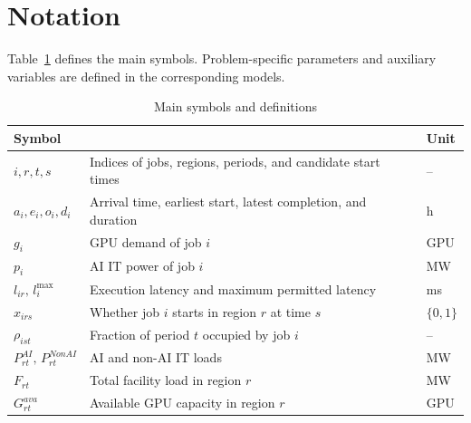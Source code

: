 \section{Notation}

Table~\ref{tab:symbols} defines the main symbols.
Problem-specific parameters and auxiliary variables are defined in the corresponding models.

\begin{table}[H]
	\centering
    \caption{Main symbols and definitions}
	\label{tab:symbols}
	
	\small
	\renewcommand{\arraystretch}{0.85}
	
	\begin{tabularx}{0.96\textwidth}{
			>{\centering\arraybackslash}p{}
			>{\raggedright\arraybackslash}X
			>{\centering\arraybackslash}p{}}
		\toprule
        \textbf{Symbol} & \multicolumn{1}{c}{\textbf{Definition}} & \textbf{Unit} \\
		\midrule
		
		$i,r,t,s$
        & Indices of jobs, regions, periods, and candidate start times
		& -- \\
		
		$a_i,e_i,o_i,d_i$
        & Arrival time, earliest start, latest completion, and duration
		& h \\
		
		$g_i$
        & GPU demand of job $i$
		& GPU \\
		
		$p_i$
        & AI IT power of job $i$
		& MW \\
		
		$l_{ir},\,l_i^{\max}$
        & Execution latency and maximum permitted latency
		& ms \\
		
		$x_{irs}$
        & Whether job $i$ starts in region $r$ at time $s$
		& $\{0,1\}$ \\
		
		$\rho_{ist}$
        & Fraction of period $t$ occupied by job $i$
		& -- \\
		
		$P^{AI}_{rt},\,P^{NonAI}_{rt}$
        & AI and non-AI IT loads
		& MW \\
		
		$F_{rt}$
        & Total facility load in region $r$
		& MW \\
		
		$G^{ava}_{rt}$
        & Available GPU capacity in region $r$
		& GPU \\
		

\end{tabularx}
\end{table}
